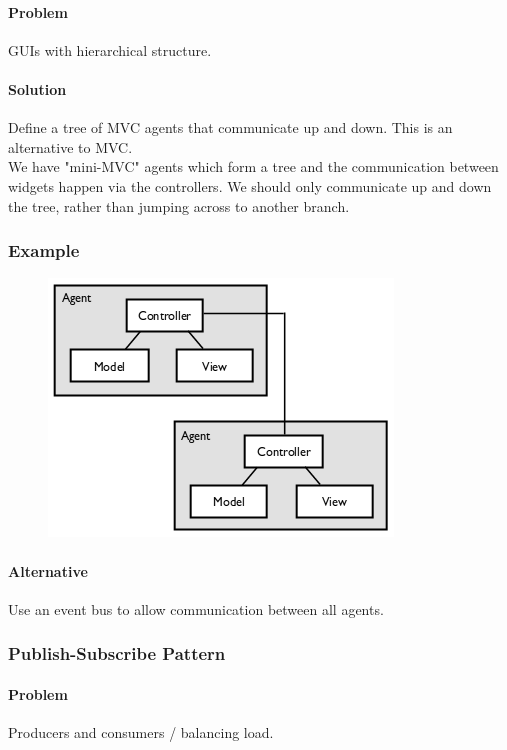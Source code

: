 \documentclass[twocolumn,english]{article}
\begin{document}
\paragraph{Problem}

GUIs with hierarchical structure.


\paragraph{Solution}

Define a tree of MVC agents that communicate up and down. This is an alternative to MVC. \\
We have "mini-MVC" agents which form a tree and the communication between widgets happen via the controllers. We should only communicate up and down the tree, rather than jumping across to another branch.


\subsubsection*{Example}

\begin{figure}[H]
\centering{}\includegraphics[width=0.4\columnwidth]{img/pac} 
\end{figure}



\paragraph{Alternative}

Use an event bus to allow communication between all agents.


\subsubsection{Publish-Subscribe Pattern}


\paragraph{Problem}

Producers and consumers / balancing load.
\end{document}
